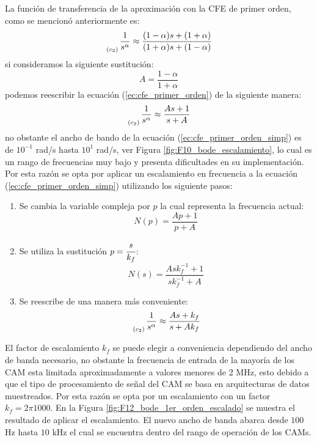 	La función de transferencia de la aproximación con la CFE de primer orden, como se mencionó anteriormente es:
	\begin{equation}
		\genfrac{}{}{0pt}{0}{}{_{(c_{2})}} \frac{1}{s^{\alpha}} \approx \frac{(1 - \alpha)s + (1 + \alpha) }{(1 + \alpha)s + (1 - \alpha)} 
		\label{ec:cfe_primer_orden}
	\end{equation}
	si consideramos la siguiente sustitución:
	\begin{equation}
		A = \frac{1 - \alpha}{1 + \alpha}
	\end{equation}
	podemos reescribir la ecuación (\ref{ec:cfe_primer_orden}) de la siguiente manera:
	\begin{equation}
		\genfrac{}{}{0pt}{0}{}{_{(c_{2})}} \frac{1}{s^{\alpha}} \approx \frac{A s + 1}{s + A}
		\label{ec:cfe_primer_orden_simp}
	\end{equation}
	no obstante el ancho de bando de la ecuación (\ref{ec:cfe_primer_orden_simp}) es de $10^{-1}$ rad/s hasta $10^{1}$ rad/s, ver Figura \ref{fig:F10_bode_escalamiento}, lo cual es un rango de frecuencias muy bajo y presenta dificultades en su implementación. Por  esta razón se opta por aplicar un escalamiento en frecuencia a la ecuación (\ref{ec:cfe_primer_orden_simp}) utilizando los siguiente pasos: 
	
	\begin{enumerate}
		\item Se cambia la variable compleja por $p$ la cual representa la frecuencia actual:
			\begin{equation}
				N(p) =  \frac{A p + 1}{p + A}
			\end{equation}
		\item Se utiliza la sustitución $p = \cfrac{s}{k_{f}}$:
			\begin{equation}
				N(s) =  \frac{A s k_{f}^{-1} + 1}{s k_{f}^{-1} + A}
			\end{equation}
		\item Se reescribe de una manera más conveniente:
			\begin{equation}
				\genfrac{}{}{0pt}{0}{}{_{(c_{2})}} \frac{1}{s^{\alpha}} \approx \frac{A s + k_{f}}{s + A k_{f}}
				\label{ec:cfe_primer_orden_simp_esc}
			\end{equation}
	\end{enumerate}	
		
	El factor de escalamiento $k_{f}$ se puede elegir a conveniencia dependiendo del ancho de banda necesario, no obstante la frecuencia de entrada de la mayoría de los CAM esta limitada aproximadamente a valores menores de 2 MHz, esto debido a que el tipo de procesamiento de señal del CAM se basa en arquitecturas de datos muestreados. Por esta razón se opta por un escalamiento con un factor $k_{f} = 2\pi 1000$. En la Figura \ref{fig:F12_bode_1er_orden_escalado} se muestra el resultado de aplicar el escalamiento. El nuevo ancho de banda abarca desde $100$ Hz hasta $10$ kHz el cual se encuentra dentro del rango de operación de los CAMs.
	
